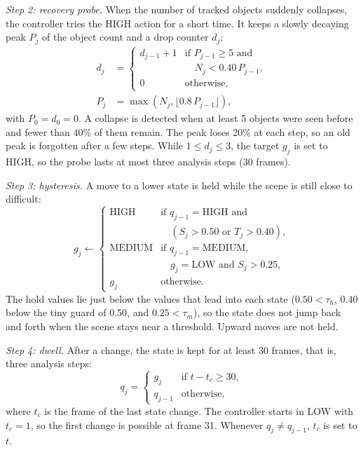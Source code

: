 \documentclass[pdflatex,sn-mathphys-num,iicol]{sn-jnl}
\begin{document}
\emph{Step 2: recovery probe.} When the number of tracked objects suddenly
collapses, the controller tries the HIGH action for a short time. It keeps a
slowly decaying peak $P_j$ of the object count and a drop counter $d_j$:
\begin{align}
d_j&=\begin{cases}
d_{j-1}+1 & \text{if } P_{j-1}\ge5 \text{ and}\\
          & \quad N_j<0.40\,P_{j-1},\\
0         & \text{otherwise,}
\end{cases}\label{eq:drop}\\
P_j&=\max\left(N_j,\lfloor 0.8\,P_{j-1}\rfloor\right),\label{eq:peak}
\end{align}
with $P_0=d_0=0$. A collapse is detected when at least 5 objects were seen
before and fewer than 40\% of them remain. The peak loses 20\% at each step,
so an old peak is forgotten after a few steps. While $1\le d_j\le3$, the
target $g_j$ is set to HIGH, so the probe lasts at most three analysis steps
(30 frames).

\emph{Step 3: hysteresis.} A move to a lower state is held while the scene is
still close to difficult:
\begin{equation}
g_j\leftarrow\begin{cases}
\text{HIGH}   & \text{if } q_{j-1}=\text{HIGH} \text{ and}\\
              & \quad (S_j>0.50 \text{ or } T_j>0.40),\\
\text{MEDIUM} & \text{if } q_{j-1}=\text{MEDIUM},\\
              & \quad g_j=\text{LOW} \text{ and } S_j>0.25,\\
g_j           & \text{otherwise.}
\end{cases}
\label{eq:hold}
\end{equation}
The hold values lie just below the values that lead into each state
($0.50<\tau_h$, 0.40 below the tiny guard of 0.50, and $0.25<\tau_m$),
so the state does not jump back and forth when the scene stays near a
threshold. Upward moves are not held.

\emph{Step 4: dwell.} After a change, the state is kept for at least 30 frames,
that is, three analysis steps:
\begin{equation}
q_j=\begin{cases}
g_j     & \text{if } t-t_c\ge30,\\
q_{j-1} & \text{otherwise,}
\end{cases}
\label{eq:dwell}
\end{equation}
where $t_c$ is the frame of the last state change. The controller starts in
LOW with $t_c=1$, so the first change is possible at frame 31. Whenever
$q_j\ne q_{j-1}$, $t_c$ is set to $t$.
\end{document}
